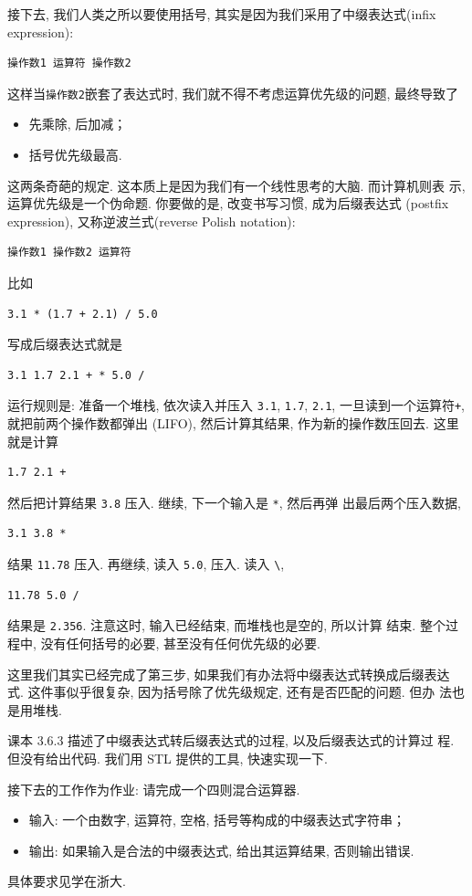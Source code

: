 \documentclass[a4paper]{ctexart}
\theoremstyle{definition}
\theoremstyle{definition}
\begin{document}
接下去, 我们人类之所以要使用括号, 其实是因为我们采用了中缀表达式(inﬁx
expression):
\begin{verbatim}
操作数1 运算符 操作数2 
\end{verbatim}
这样当\verb|操作数2|嵌套了表达式时, 我们就不得不考虑运算优先级的问题,
最终导致了
\begin{itemize}
\item 先乘除, 后加减；
\item 括号优先级最高.
\end{itemize}
这两条奇葩的规定. 这本质上是因为我们有一个线性思考的大脑. 而计算机则表
示, 运算优先级是一个伪命题. 你要做的是, 改变书写习惯, 成为后缀表达式
(postﬁx expression), 又称逆波兰式(reverse Polish notation):
\begin{verbatim}
操作数1 操作数2 运算符  
\end{verbatim}
比如
\begin{verbatim}
3.1 * (1.7 + 2.1) / 5.0
\end{verbatim}
写成后缀表达式就是
\begin{verbatim}
3.1 1.7 2.1 + * 5.0 /
\end{verbatim}
运行规则是: 准备一个堆栈, 依次读入并压入 \verb|3.1|, \verb|1.7|,
\verb|2.1|, 一旦读到一个运算符\verb|+|, 就把前两个操作数都弹出
(LIFO), 然后计算其结果, 作为新的操作数压回去. 这里就是计算
\begin{verbatim}
1.7 2.1 +
\end{verbatim}
然后把计算结果 \verb|3.8| 压入. 继续, 下一个输入是 \verb|*|, 然后再弹
出最后两个压入数据,
\begin{verbatim}
3.1 3.8 *
\end{verbatim}
结果 \verb|11.78| 压入. 再继续, 读入 \verb|5.0|, 压入. 读入 \verb|\|,
\begin{verbatim}
11.78 5.0 /
\end{verbatim}
结果是 \verb|2.356|. 注意这时, 输入已经结束, 而堆栈也是空的, 所以计算
结束. 整个过程中, 没有任何括号的必要, 甚至没有任何优先级的必要.

这里我们其实已经完成了第三步, 如果我们有办法将中缀表达式转换成后缀表达
式. 这件事似乎很复杂, 因为括号除了优先级规定, 还有是否匹配的问题. 但办
法也是用堆栈.

课本 3.6.3 描述了中缀表达式转后缀表达式的过程, 以及后缀表达式的计算过
程. 但没有给出代码. 我们用 STL 提供的工具, 快速实现一下.

接下去的工作作为作业: 请完成一个四则混合运算器.
\begin{itemize}
\item 输入: 一个由数字, 运算符, 空格, 括号等构成的中缀表达式字符串；
\item 输出: 如果输入是合法的中缀表达式, 给出其运算结果, 否则输出错误.
\end{itemize}
具体要求见学在浙大. 
\end{document}
